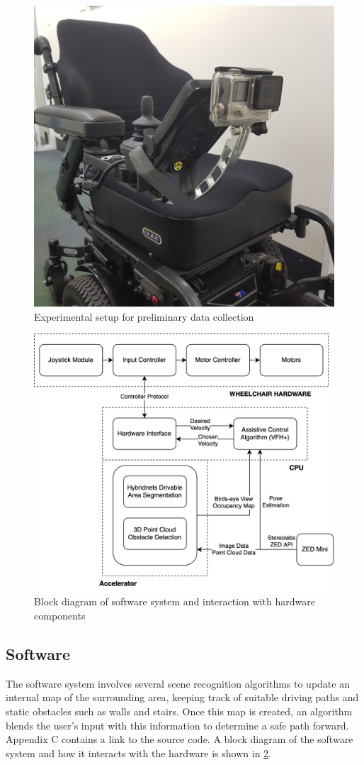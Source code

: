 \begin{figure}[p]
    \centering
    \includegraphics[width=0.45\linewidth,angle=270,origin=c]{images/gopro_dataset_collection.jpg}
    \caption{Experimental setup for preliminary data collection}
    \label{fig:gopro_dataset_collection}
\end{figure}

\begin{figure}[p]
    \centering
    \includegraphics[width=0.8\linewidth]{images/block_diagram.png}
    \caption{Block diagram of software system and interaction with hardware components}
    \label{fig:block_diagram}
\end{figure}\clearpage

\subsection{Software}
The software system involves several scene recognition algorithms to update an internal
map of the surrounding area, keeping track of suitable driving paths and static obstacles
such as walls and stairs. Once this map is created, an algorithm blends the
user's input with this information to determine a safe path forward.
Appendix C contains a link to the source code. A block diagram of the software system
and how it interacts with the hardware is shown in \cref{fig:block_diagram}.

